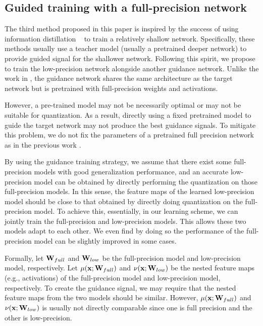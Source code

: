 \documentclass[10pt,twocolumn,letterpaper]{article}
\begin{document}
\subsection{Guided training with a full-precision network}\label{sec:mutual}
The third method proposed in this paper is inspired by the success of using information distillation ~\cite{romero2014fitnets, hinton2015distilling, parisotto2016actor, zagoruyko2016paying, ba2014deep} to train a relatively shallow network. Specifically, these methods usually use a teacher model (usually a pretrained deeper network) to provide guided signal for the shallower network. Following this spirit, we propose to train the low-precision network alongside another guidance network. Unlike the work in \cite{romero2014fitnets, hinton2015distilling, parisotto2016actor, zagoruyko2016paying, ba2014deep}, the guidance network shares the same architecture as the target network but is pretrained with full-precision weights and activations.

However, a pre-trained model may not be necessarily optimal or may not be suitable for quantization. As a result, directly using a fixed pretrained model to guide the target network may not produce the best guidance signals. To mitigate this problem, we do not fix the parameters of a pretrained full precision network as in the previous work \cite{zhang2017deep}.


By using the guidance training strategy, we assume that there exist some full-precision models with good generalization performance, and an accurate low-precision model can be obtained by directly performing the quantization on those full-precision models. In this sense, the feature maps of the learned low-precision model should be close to that obtained by directly doing quantization on the full-precision model. To achieve this, essentially, in our learning scheme, we can jointly train the full-precision and low-precision models. This allows these two models adapt to each other. We even find by doing so the performance of the full-precision model can be slightly improved in some cases.

%

Formally, let ${{\bf{W}}_{full}}$ and ${{\bf{W}}_{low}}$ be the full-precision model and low-precision model, respectively. Let $\mu ({\bf{x}};{{\bf{W}}_{{full}}})$ and $\nu ({\bf{x}};{{\bf{W}}_{{low}}})$ be the nested feature maps (e.g., activations) of the full-precision model and low-precision model, respectively. To create the guidance signal, we may require that the nested feature maps from the two models should be similar. However,  $\mu ({\bf{x}};{{\bf{W}}_{{full}}})$ and $\nu ({\bf{x}};{{\bf{W}}_{{low}}})$  is usually not directly comparable since one is full precision and the other is low-precision.
\end{document}
